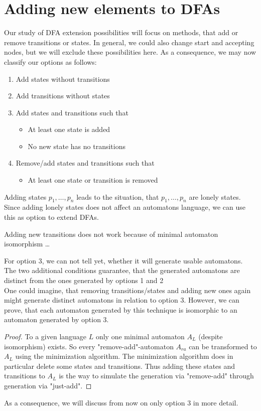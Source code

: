 \documentclass[a4paper, oneside, 11pt]{report}
\theoremstyle{definition}
\theoremstyle{remark}
\begin{document}
\section{Adding new elements to DFAs}

Our study of DFA extension possibilities will focus on methods, that add or remove transitions or states. In general, we could also change start and accepting nodes, but we will exclude these possibilities here. As a consequence, we may now classify our options as follows:
\begin{enumerate}
	\item Add states without transitions
	\item Add transitions without states
	\item Add states and transitions such that
	\begin{itemize}
		\item At least one state is added
		\item No new state has no transitions
	\end{itemize}
	\item Remove/add states and transitions such that
	\begin{itemize}
		\item At least one state or transition is removed
	\end{itemize}
\end{enumerate}
Adding states $p_1, \ldots, p_n$ leads to the situation, that $p_1, \ldots, p_n$ are lonely states. Since adding lonely states does not affect an automatons language, we can use this as option to extend DFAs.

Adding new transitions does not work because of minimal automaton isomorphism \ldots

For option 3, we can not tell yet, whether it will generate usable automatons. The two additional conditions guarantee, that the generated automatons are distinct from the ones generated by options 1 and 2 \\

\noindent One could imagine, that removing transitions/states and adding new ones again might generate distinct automatons in relation to option 3. However, we can prove, that each automaton generated by this technique is isomorphic to an automaton generated by option 3.

\begin{proof}
	To a given language $L$ only one minimal automaton $A_L$ (despite isomorphism) exists.
	So every "remove-add"-automaton $A_{ra}$ can be transformed to $A_L$ using the minimization algorithm.
	The minimization algorithm does in particular delete some states and transitions.
	Thus adding these states and transitions to $A_L$ is the way to simulate the generation via "remove-add" through generation via "just-add".
\end{proof}
\noindent As a consequence, we will discuss from now on only option 3 in more detail.
\end{document}
